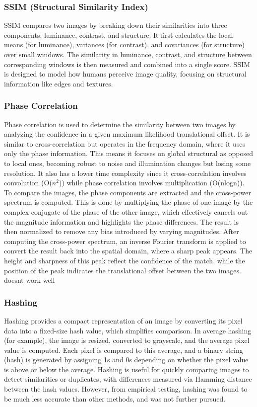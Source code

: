 \subsubsection*{SSIM (Structural Similarity Index)}  
SSIM compares two images by breaking down their similarities into three components: luminance, contrast, and structure. It first calculates the local means (for luminance), variances (for contrast), and covariances (for structure) over small windows. The similarity in luminance, contrast, and structure between corresponding windows is then measured and combined into a single score. SSIM is designed to model how humans perceive image quality, focusing on structural information like edges and textures.

\subsubsection*{Phase Correlation}  
Phase correlation is used to determine the similarity between two images by analyzing the confidence in a given maximum likelihood translational offset. It is similar to cross-correlation but operates in the frequency domain, where it uses only the phase information. This means it focuses on global structural as opposed to local ones, becoming robust to noise and illumination changes but losing some resolution. It also has a lower time complexity since it cross-correlation involves convolution (O($n^2$)) while phase correlation involves multiplication (O(nlogn)). 
To compare the images, the phase components are extracted and the cross-power spectrum is computed. This is done by multiplying the phase of one image by the complex conjugate of the phase of the other image, which effectively cancels out the magnitude information and highlights the phase differences. The result is then normalized to remove any bias introduced by varying magnitudes. After computing the cross-power spectrum, an inverse Fourier transform is applied to convert the result back into the spatial domain, where a sharp peak appears. The height and sharpness of this peak reflect the confidence of the match, while the position of the peak indicates the translational offset between the two images.
doesnt work well 




\subsubsection*{Hashing}  
Hashing provides a compact representation of an image by converting its pixel data into a fixed-size hash value, which simplifies comparison. In average hashing (for example), the image is resized, converted to grayscale, and the average pixel value is computed. Each pixel is compared to this average, and a binary string (hash) is generated by assigning 1s and 0s depending on whether the pixel value is above or below the average. Hashing is useful for quickly comparing images to detect similarities or duplicates, with differences measured via Hamming distance between the hash values. However, from empirical testing, hashing was found to be much less accurate than other methods, and was not further pursued.

